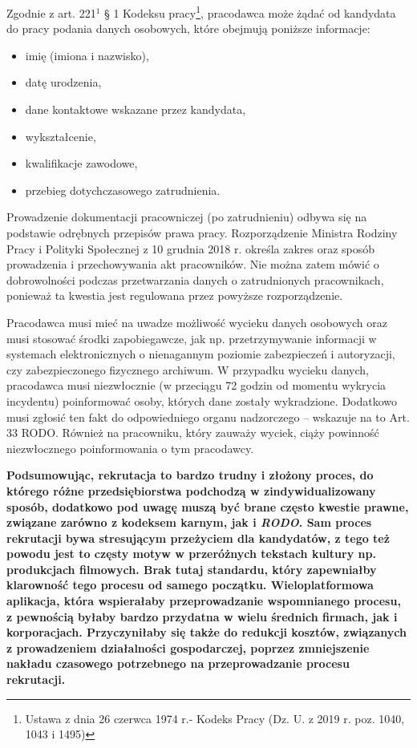 \documentclass[twoside]{projektInzynierskiMS}
\numberwithin{figure}{section}
\begin{document}
Zgodnie z art. 221$^{1}$ § 1 Kodeksu pracy\footnote{Ustawa z dnia 26 czerwca 1974 r.- Kodeks Pracy (Dz. U. z 2019 r. poz. 1040, 1043 i 1495)}, pracodawca może żądać od kandydata do pracy podania danych osobowych, które obejmują poniższe informacje:

\begin{itemize}
\item imię (imiona i nazwisko),
\item datę urodzenia,
\item dane kontaktowe wskazane przez kandydata,
\item wykształcenie,
\item kwalifikacje zawodowe,
\item przebieg dotychczasowego zatrudnienia.
\end{itemize}


Prowadzenie dokumentacji pracowniczej (po zatrudnieniu) odbywa się na podstawie odrębnych przepisów prawa pracy. Rozporządzenie Ministra Rodziny Pracy i Polityki Społecznej z 10 grudnia 2018 r. określa zakres oraz sposób prowadzenia i przechowywania akt pracowników. Nie można zatem mówić o dobrowolności podczas przetwarzania danych o zatrudnionych pracownikach, ponieważ ta kwestia jest regulowana przez powyższe rozporządzenie.

Pracodawca musi mieć na uwadze możliwość wycieku danych osobowych oraz musi stosować środki zapobiegawcze, jak np. przetrzymywanie informacji w systemach elektronicznych o nienagannym poziomie zabezpieczeń i autoryzacji, czy zabezpieczonego fizycznego archiwum. W przypadku wycieku danych, pracodawca musi niezwłocznie (w przeciągu 72 godzin od momentu wykrycia incydentu) poinformować osoby, których dane zostały wykradzione. Dodatkowo musi zgłosić ten fakt do odpowiedniego organu nadzorczego – wskazuje na to Art. 33 RODO. Również na pracowniku, który zauważy wyciek, ciąży powinność niezwłocznego poinformowania o tym pracodawcy.
\newpage

\textbf{Podsumowując, rekrutacja to bardzo trudny i złożony proces, do którego różne przedsiębiorstwa podchodzą w zindywidualizowany sposób, dodatkowo pod uwagę muszą być brane często kwestie prawne, związane zarówno z kodeksem karnym, jak i \textit{RODO}. Sam proces rekrutacji bywa stresującym przeżyciem dla kandydatów, z tego też powodu jest to częsty motyw w przeróżnych tekstach kultury np. produkcjach filmowych. Brak tutaj standardu, który zapewniałby klarowność tego procesu od samego początku. Wieloplatformowa aplikacja, która wspierałaby przeprowadzanie wspomnianego procesu, z pewnością byłaby bardzo przydatna w wielu średnich firmach, jak i korporacjach. Przyczyniłaby się także do redukcji kosztów, związanych z prowadzeniem działalności gospodarczej, poprzez zmniejszenie nakładu czasowego potrzebnego na przeprowadzanie procesu rekrutacji.}
\end{document}
